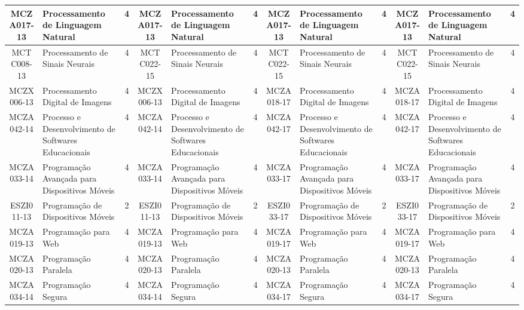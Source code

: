 \documentclass[a4paper]{article}
\begin{document}
\begin{landscape}
{\begin{longtable}{|c|p{.2\textheight}|c||c|p{.2\textheight}|c||c|p{.2\textheight}|c||c|p{.2\textheight}|c|}
MCZA017-13 & Processamento de Linguagem Natural & 4 &
MCZA017-13 & Processamento de Linguagem Natural & 4 &
MCZA017-13 & Processamento de Linguagem Natural & 4 &
MCZA017-13 & Processamento de Linguagem Natural & 4\\ \hline

MCTC008-13 & Processamento de Sinais Neurais & 4 &
MCTC022-15 & Processamento de Sinais Neurais & 4 &
MCTC022-15 & Processamento de Sinais Neurais & 4 &
MCTC022-15 & Processamento de Sinais Neurais & 4\\ \hline

MCZX006-13 & Processamento Digital de Imagens & 4 &
MCZX006-13 & Processamento Digital de Imagens & 4 &
MCZA018-17 & Processamento Digital de Imagens & 4 &
MCZA018-17 & Processamento Digital de Imagens & 4\\ \hline

MCZA042-14 & Processo e Desenvolvimento de Softwares Educacionais & 4 &
MCZA042-14 & Processo e Desenvolvimento de Softwares Educacionais & 4 &
MCZA042-17 & Processo e Desenvolvimento de Softwares Educacionais & 4 & 
MCZA042-17 & Processo e Desenvolvimento de Softwares Educacionais & 4\\ \hline

MCZA033-14 & Programação Avançada para Dispositivos Móveis & 4 &
MCZA033-14 & Programação Avançada para Dispositivos Móveis & 4 &
MCZA033-17 & Programação Avançada para Dispositivos Móveis & 4 & 
MCZA033-17 & Programação Avançada para Dispositivos Móveis & 4\\ \hline

ESZI011-13 & Programação de Dispositivos Móveis & 2 &
ESZI011-13 & Programação de Dispositivos Móveis & 2 &
ESZI033-17 & Programação de Dispositivos Móveis & 2 &
ESZI033-17 & Programação de Dispositivos Móveis & 2\\ \hline

MCZA019-13 & Programação para Web & 4 &
MCZA019-13 & Programação para Web & 4 &
MCZA019-17 & Programação para Web & 4 &
MCZA019-17 & Programação para Web & 4\\ \hline

MCZA020-13 & Programação Paralela & 4 &
MCZA020-13 & Programação Paralela & 4 &
MCZA020-13 & Programação Paralela & 4 & 
MCZA020-13 & Programação Paralela & 4\\ \hline

MCZA034-14 & Programação Segura & 4 &
MCZA034-14 & Programação Segura & 4 &
MCZA034-17 & Programação Segura & 4 &
MCZA034-17 & Programação Segura & 4\\ \hline


\end{longtable}}
\end{landscape}
\end{document}

